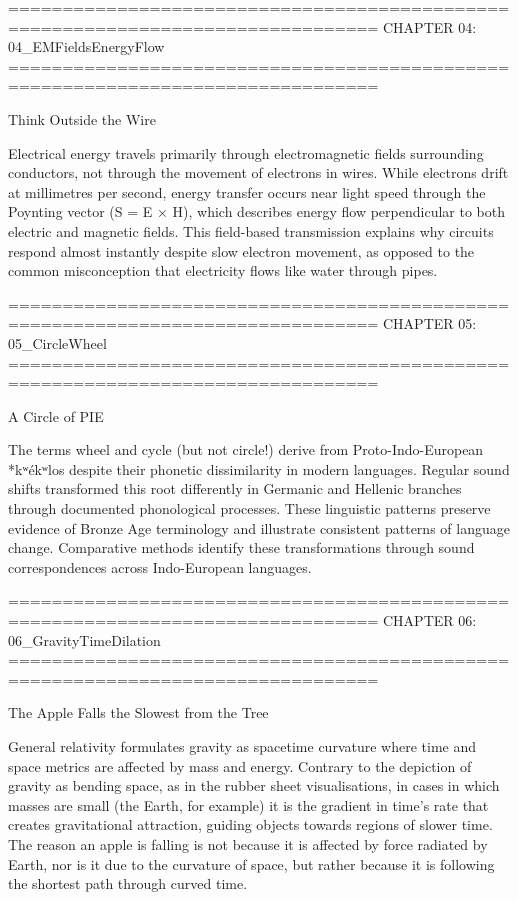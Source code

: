 ================================================================================
CHAPTER 04: 04_EMFieldsEnergyFlow
================================================================================

Think Outside the Wire

Electrical energy travels primarily through electromagnetic fields surrounding conductors, not through the movement of electrons in wires. While electrons drift at millimetres per second, energy transfer occurs near light speed through the Poynting vector (S = E × H), which describes energy flow perpendicular to both electric and magnetic fields. This field-based transmission explains why circuits respond almost instantly despite slow electron movement, as opposed to the common misconception that electricity flows like water through pipes.


================================================================================
CHAPTER 05: 05_CircleWheel
================================================================================

A Circle of PIE

The terms \QSOpen{}wheel\QSClose{} and \QSOpen{}cycle\QSClose{} (but not circle!) derive from Proto-Indo-European *kʷékʷlos despite their phonetic dissimilarity in modern languages. Regular sound shifts transformed this root differently in Germanic and Hellenic branches through documented phonological processes. These linguistic patterns preserve evidence of Bronze Age terminology and illustrate consistent patterns of language change. Comparative methods identify these transformations through sound correspondences across Indo-European languages.


================================================================================
CHAPTER 06: 06_GravityTimeDilation
================================================================================

The Apple Falls the Slowest from the Tree

General relativity formulates gravity as spacetime curvature where time and space metrics are affected by mass and energy. Contrary to the depiction of gravity as bending space, as in the rubber sheet visualisations, in cases in which masses are small (the Earth, for example) it is the gradient in time's rate that creates gravitational attraction, guiding objects towards regions of slower time. The reason an apple is falling is not because it is affected by force radiated by Earth, nor is it due to the curvature of space, but rather because it is following the shortest path through curved time.


